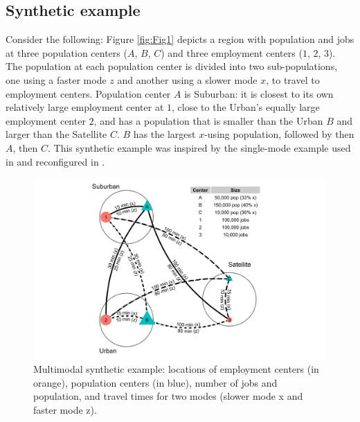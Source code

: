 \documentclass[]{trbunofficial}
\begin{document}
\hypertarget{synthetic-example}{%
\subsection{Synthetic example}\label{synthetic-example}}

Consider the following: Figure \ref{fig:Fig1} depicts a region with
population and jobs at three population centers (\(A\), \(B\), \(C\))
and three employment centers (\(1\), \(2\), \(3\)). The population at
each population center is divided into two sub-populations, one using a
faster mode \(z\) and another using a slower mode \(x\), to travel to
employment centers. Population center \(A\) is Suburban: it is closest
to its own relatively large employment center at \(1\), close to the
Urban's equally large employment center \(2\), and has a population that
is smaller than the Urban \(B\) and larger than the Satellite \(C\).
\(B\) has the largest \(x\)-using population, followed by then \(A\),
then \(C\). This synthetic example was inspired by the single-mode
example used in \citet{shenLocationCharacteristicsInnercity1998} and
reconfigured in \citet{soukhovIntroducingSpatialAvailability2023}.

\begin{figure}

{\centering \includegraphics[width=1\linewidth]{images/Fig1} 

}

\caption{\label{fig:Fig1} Multimodal synthetic example: locations of employment centers (in orange), population centers (in blue), number of jobs and population, and travel times for two modes (slower mode x and faster mode z).}\label{fig:synthetic-example-plot}
\end{figure}
\end{document}
